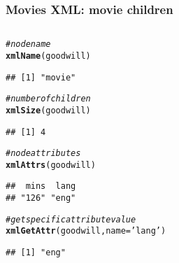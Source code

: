 \documentclass[12pt]{beamer}\usepackage[]{graphicx}\usepackage[]{color}
\makeatletter
\newcommand{\hlstr}[1]{\textcolor[rgb]{0.192,0.494,0.8}{#1}}%
\newcommand{\hlcom}[1]{\textcolor[rgb]{0.678,0.584,0.686}{\textit{#1}}}%
\newcommand{\hlstd}[1]{\textcolor[rgb]{0.345,0.345,0.345}{#1}}%
\newcommand{\hlkwc}[1]{\textcolor[rgb]{0.333,0.667,0.333}{#1}}%
\newcommand{\hlkwd}[1]{\textcolor[rgb]{0.737,0.353,0.396}{\textbf{#1}}}%
\newenvironment{kframe}{%
 \def\at@end@of@kframe{}%
 \ifinner\ifhmode%
  \def\at@end@of@kframe{\end{minipage}}%
  \begin{minipage}{\columnwidth}%
 \fi\fi%
 \def\FrameCommand##1{\hskip\@totalleftmargin \hskip-\fboxsep
 \colorbox{shadecolor}{##1}\hskip-\fboxsep
     \hskip-\linewidth \hskip-\@totalleftmargin \hskip\columnwidth}%
 \MakeFramed {\advance\hsize-\width
   \@totalleftmargin\z@ \linewidth\hsize
   \@setminipage}}%
 {\par\unskip\endMakeFramed%
 \at@end@of@kframe}
\newenvironment{knitrout}{}{} %
\makeatother
\begin{document}

\begin{frame}[fragile]
\frametitle{Movies XML: movie children}

\begin{columns}[t]
\begin{column}{0.5\textwidth}
\begin{knitrout}\tiny
{}\color{fgcolor}\begin{kframe}
\begin{alltt}
\hlcom{# node name}
\hlkwd{xmlName}\hlstd{(goodwill)}
\end{alltt}
\begin{verbatim}
## [1] "movie"
\end{verbatim}
\begin{alltt}
\hlcom{# number of children}
\hlkwd{xmlSize}\hlstd{(goodwill)}
\end{alltt}
\begin{verbatim}
## [1] 4
\end{verbatim}
\begin{alltt}
\hlcom{# node attributes}
\hlkwd{xmlAttrs}\hlstd{(goodwill)}
\end{alltt}
\begin{verbatim}
##  mins  lang 
## "126" "eng"
\end{verbatim}
\begin{alltt}
\hlcom{# get specific attribute value}
\hlkwd{xmlGetAttr}\hlstd{(goodwill,} \hlkwc{name} \hlstd{=} \hlstr{'lang'}\hlstd{)}
\end{alltt}
\begin{verbatim}
## [1] "eng"
\end{verbatim}
\end{kframe}
\end{knitrout}
\end{column}


\end{columns}
\end{frame}
\end{document}
